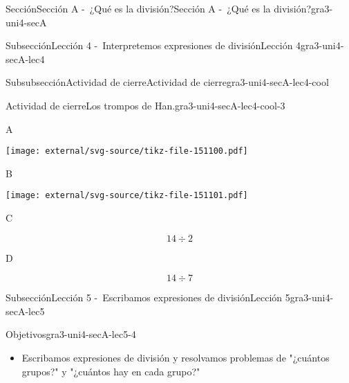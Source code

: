 \documentclass[twoside,14pt,]{extarticle}
\begin{document}
\begin{sectionptx}{Sección}{Sección A -~¿Qué es la división?}{}{Sección A -~¿Qué es la división?}{}{}{gra3-uni4-secA}
\begin{subsectionptx}{Subsección}{Lección 4 -~Interpretemos expresiones de división}{}{Lección 4}{}{}{gra3-uni4-secA-lec4}
\begin{subsubsectionptx}{Subsubsección}{Actividad de cierre}{}{Actividad de cierre}{}{}{gra3-uni4-secA-lec4-cool}
\begin{project}{Actividad de cierre}{Los trompos de Han.}{gra3-uni4-secA-lec4-cool-3}
\begin{sidebyside}{4}{0.0075}{0.0075}{0.015}
\begin{sbspanel}{0.02}%
A%
\end{sbspanel}%
\begin{sbspanel}{0.45}%
\texttt{[image: external/svg-source/tikz-file-151100.pdf]}
\end{sbspanel}%
\begin{sbspanel}{0.02}%
B%
\end{sbspanel}%
\begin{sbspanel}{0.45}%
\texttt{[image: external/svg-source/tikz-file-151101.pdf]}
\end{sbspanel}%
\end{sidebyside}%
\begin{sidebyside}{4}{0.0075}{0.0075}{0.015}%
\begin{sbspanel}{0.02}%
C%
\end{sbspanel}%
\begin{sbspanel}{0.45}%
\par
%
\begin{equation*}
14\div 2
\end{equation*}
%
\end{sbspanel}%
\begin{sbspanel}{0.02}%
\par
D%
\end{sbspanel}%
\begin{sbspanel}{0.45}%
\par
%
\begin{equation*}
14\div 7
\end{equation*}
%
\end{sbspanel}%
\end{sidebyside}%
\end{project}%
\end{subsubsectionptx}
\end{subsectionptx}
%
%
\typeout{************************************************}
\typeout{************************************************}
%
\begin{subsectionptx}{Subsección}{Lección 5 -~Escribamos expresiones de división}{}{Lección 5}{}{}{gra3-uni4-secA-lec5}
\begin{objectives}{Objetivos}{gra3-uni4-secA-lec5-4}
%
\begin{itemize}[label=\textbullet]
\item{}Escribamos expresiones de división y resolvamos problemas de "¿cuántos grupos?" y "¿cuántos hay en cada grupo?"%

\end{itemize}
\end{objectives}
\end{subsectionptx}
\end{sectionptx}
\end{document}
